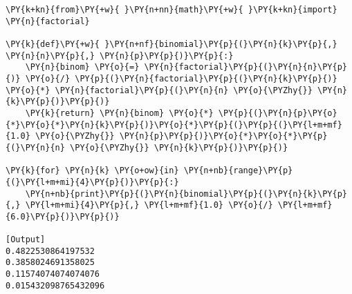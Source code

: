 \begin{Verbatim}[label=\makebox{\href{https://github.com/unipi-physics-labs/lab1-notes/tree/main/snippy/binomial.py}{https://github.com/.../binomial.py}},commandchars=\\\{\}]
\PY{k+kn}{from}\PY{+w}{ }\PY{n+nn}{math}\PY{+w}{ }\PY{k+kn}{import} \PY{n}{factorial}

\PY{k}{def}\PY{+w}{ }\PY{n+nf}{binomial}\PY{p}{(}\PY{n}{k}\PY{p}{,} \PY{n}{n}\PY{p}{,} \PY{n}{p}\PY{p}{)}\PY{p}{:}
    \PY{n}{binom} \PY{o}{=} \PY{n}{factorial}\PY{p}{(}\PY{n}{n}\PY{p}{)} \PY{o}{/} \PY{p}{(}\PY{n}{factorial}\PY{p}{(}\PY{n}{k}\PY{p}{)} \PY{o}{*} \PY{n}{factorial}\PY{p}{(}\PY{n}{n} \PY{o}{\PYZhy{}} \PY{n}{k}\PY{p}{)}\PY{p}{)}
    \PY{k}{return} \PY{n}{binom} \PY{o}{*} \PY{p}{(}\PY{n}{p}\PY{o}{*}\PY{o}{*}\PY{n}{k}\PY{p}{)}\PY{o}{*}\PY{p}{(}\PY{p}{(}\PY{l+m+mf}{1.0} \PY{o}{\PYZhy{}} \PY{n}{p}\PY{p}{)}\PY{o}{*}\PY{o}{*}\PY{p}{(}\PY{n}{n} \PY{o}{\PYZhy{}} \PY{n}{k}\PY{p}{)}\PY{p}{)}

\PY{k}{for} \PY{n}{k} \PY{o+ow}{in} \PY{n+nb}{range}\PY{p}{(}\PY{l+m+mi}{4}\PY{p}{)}\PY{p}{:}
    \PY{n+nb}{print}\PY{p}{(}\PY{n}{binomial}\PY{p}{(}\PY{n}{k}\PY{p}{,} \PY{l+m+mi}{4}\PY{p}{,} \PY{l+m+mf}{1.0} \PY{o}{/} \PY{l+m+mf}{6.0}\PY{p}{)}\PY{p}{)}

[Output]
0.4822530864197532
0.3858024691358025
0.11574074074074076
0.015432098765432096
\end{Verbatim}
